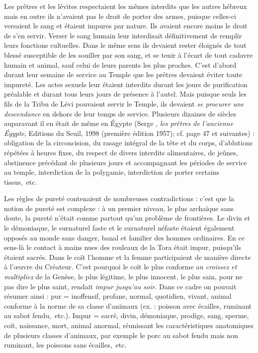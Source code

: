  Les prêtres et les lévites respectaient les mêmes interdits que les autres hébreux mais en outre ils n'avaient pas le droit de porter des armes, puisque celles-ci versaient le sang et étaient impures par nature. Ils avaient encore moins le droit de s'en servir. Verser le sang humain leur interdisait définitivement de remplir leurs fonctions cultuelles. Dans le même sens ils devaient rester éloignés de tout blessé susceptible de les souiller par son sang, et se tenir à l'écart de tout cadavre humain et animal, sauf celui de leurs parents les plus proches. C'est d'abord durant leur semaine de service au Temple que les prêtres devaient éviter toute impureté. Les actes sexuels leur étaient interdits durant les jours de purification préalable et durant tous leurs jours de présence à l'autel. Mais puisque seuls les fils de la Tribu de Lévi pouvaient servir le Temple, ils devaient \emph{se procurer une descendance} en dehors de leur temps de service. Plusieurs dizaines de siècles auparavant il en était de même en Égypte (Serge , \emph{les prêtres de l'ancienne Égypte}, Editions du Seuil, 1998 (première édition 1957); cf. page 47 et suivantes) : obligation de la circoncision, du rasage intégral de la tête et du corps, d'ablutions répétées à heures fixes, du respect de divers interdits alimentaires, de jeûnes, abstinence précédant de plusieurs jours et accompagnant les périodes de service au temple, interdiction de la polygamie, interdiction de porter certains tissus,~etc. 

 Les règles de pureté contenaient de nombreuses contradictions : c'est que la notion de pureté est complexe : à un premier niveau, le plus archaïque sans doute, la pureté n'était comme partout qu'un problème de frontières. Le divin et le démoniaque, le surnaturel faste et le surnaturel néfaste étaient également opposés au monde sans danger, banal et familier des hommes ordinaires. En ce sens-là le contact à mains nues des rouleaux de la Tora était impur, puisqu'ils étaient sacrés. Dans le coït l'homme et la femme participaient de manière directe à l'œuvre du Créateur. C'est pourquoi le coït le plus conforme au {\emph{croissez et multipliez}} de la Genèse, le plus légitime, le plus innocent, le plus sain, pour ne pas dire le plus saint, rendait \emph{impur jusqu'au soir}. Dans ce cadre on pouvait résumer ainsi : pur = inoffensif, profane, normal, quotidien, vivant, animal conforme à la norme de sa classe d'animaux (ex. : poisson avec écailles, ruminant au sabot fendu,~etc.). Impur = sacré, divin, démoniaque, prodige, sang, sperme, coït, naissance, mort, animal anormal, réunissant les caractéristiques anatomiques de plusieurs classes d'animaux, par exemple le porc au sabot fendu mais non ruminant, les poissons sans écailles,~etc. 

